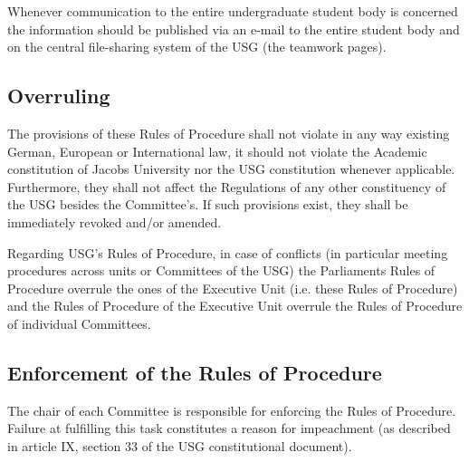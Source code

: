 Whenever communication to the entire undergraduate student body is concerned the information should be published via an e-mail to the entire student body and on the central file-sharing system of the USG (the teamwork pages).

\subsection{Overruling}\label{provision:overruling}
The provisions of these Rules of Procedure shall not violate in any way existing German, European or International law, it should not violate the Academic constitution of Jacobs University nor the USG constitution whenever applicable. Furthermore, they shall not affect the Regulations of any other constituency of the USG besides the Committee's. If such provisions exist, they shall be immediately revoked and/or amended.

Regarding USG's Rules of Procedure, in case of conflicts (in particular meeting procedures across units or Committees of the USG) the Parliaments Rules of Procedure overrule the ones of the Executive Unit (i.e. these Rules of Procedure) and the Rules of Procedure of the Executive Unit overrule the Rules of Procedure of individual Committees. 

\subsection{Enforcement of the Rules of Procedure}
The chair of each Committee is responsible for enforcing the Rules of Procedure. Failure at fulfilling this task constitutes a reason for impeachment (as described in article IX, section 33 of the USG constitutional document).